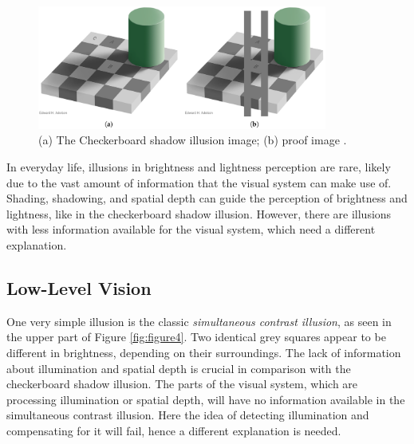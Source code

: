 \begin{figure}[H]
    \centering
    \centering
    \includegraphics[width=0.85\textwidth]{media/checkershadow_double_full_.png}
    \begin{minipage}{0.8\textwidth}
    \caption{(a) The Checkerboard shadow illusion image; (b) proof image
    \parencite{adelson1995checkershadow}.}
    \label{fig:figure3}
    \end{minipage}
\end{figure}

In everyday life, illusions in brightness and lightness perception are rare, likely due to
the vast amount of information that the visual system can make use of. Shading, shadowing,
and spatial depth can guide the perception of brightness and lightness, like in the
checkerboard shadow illusion. However, there are illusions with less information available
for the visual system, which need a different explanation.

\subsection{Low-Level Vision}

One very simple illusion is the classic \emph{simultaneous contrast illusion}, as seen in
the upper part of Figure \ref{fig:figure4}. Two identical grey squares appear to be
different in brightness, depending on their surroundings. The lack of information about
illumination and spatial depth is crucial in comparison with the checkerboard shadow
illusion. The parts of the visual system, which are processing illumination or spatial
depth, will have no information available in the simultaneous contrast illusion. Here the
idea of detecting illumination and compensating for it will fail, hence a different
explanation is needed.

